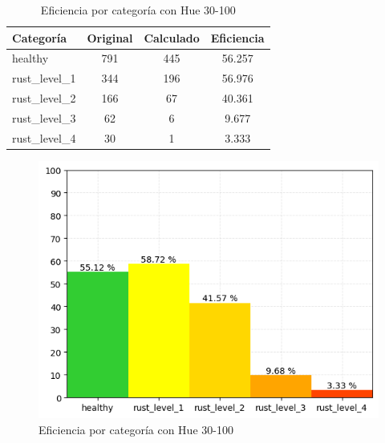 \captionsetup[figure]{skip=10pt}

\begin{table}[h!]
\centering
\begin{tabular}{|l|c|c|c|}
\hline 
\textbf{Categoría} & \textbf{Original} & \textbf{Calculado} & \textbf{Eficiencia} \\
\hline
healthy & 791 & 445 & 56.257 \\
\hline 
rust\_level\_1 & 344 & 196 & 56.976 \\
\hline 
rust\_level\_2 & 166 & 67 & 40.361 \\
\hline 
rust\_level\_3 & 62 & 6 & 9.677 \\
\hline 
rust\_level\_4 & 30 & 1 & 3.333 \\
\hline 
\end{tabular}
\caption{Eficiencia por categoría con Hue 30-100}
\label{table:efficiency_categories_30_100}
\end{table}

\begin{figure}
\centering
\includegraphics[scale=0.6]{images/result_classes_30_100.png}
\caption{Eficiencia por categoría con Hue 30-100}
\label{img:efficiency_categories_30_100}
\end{figure}
